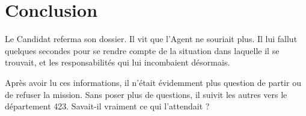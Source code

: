 \section{Conclusion}

Le Candidat referma son dossier. Il vit que l'Agent ne souriait plus. Il lui
fallut quelques secondes pour se rendre compte de la situation dans laquelle il
se trouvait, et les responsabilités qui lui incombaient désormais.

Après avoir lu ces informations, il n'était évidemment plus question de partir
ou de refuser la mission. Sans poser plus de questions, il suivit les autres
vers le département 423. Savait-il vraiment ce qui l'attendait ?
